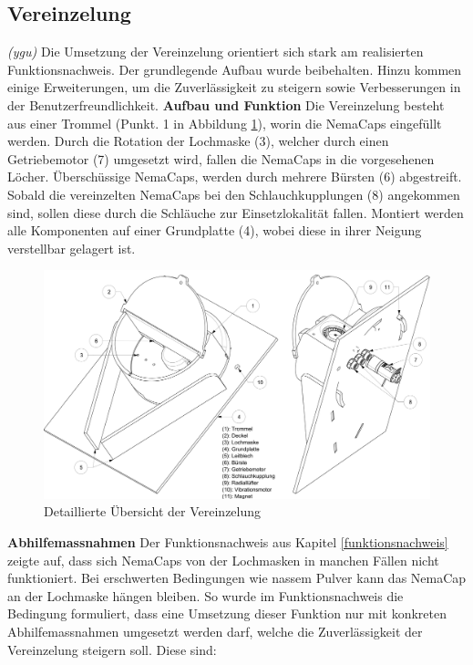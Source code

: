\subsection{Vereinzelung} \label{sec:Vereinzelung}
\textit{(ygu)} Die Umsetzung der Vereinzelung orientiert sich stark am realisierten Funktionsnachweis. Der grundlegende Aufbau wurde beibehalten. Hinzu kommen einige Erweiterungen, um die Zuverlässigkeit zu steigern sowie Verbesserungen in der Benutzerfreundlichkeit.
\newline
\newline
\textbf{Aufbau und Funktion}
\newline
Die Vereinzelung besteht aus einer Trommel (Punkt. 1 in Abbildung \ref{fig:details_vereinzelung}), worin die NemaCaps eingefüllt werden. Durch die Rotation der Lochmaske (3), welcher durch einen Getriebemotor (7) umgesetzt wird, fallen die NemaCaps in die vorgesehenen Löcher. Überschüssige NemaCaps, werden durch mehrere Bürsten (6) abgestreift. Sobald die vereinzelten NemaCaps bei den Schlauchkupplungen (8) angekommen sind, sollen diese durch die Schläuche zur Einsetzlokalität fallen. Montiert werden alle Komponenten auf einer Grundplatte (4), wobei diese in ihrer Neigung verstellbar gelagert ist.
	\begin{figure}[H]
	\includegraphics[scale=0.45]{Illustrationen/6-Umsetzung/details_vereinzelung.jpg}
	\caption{Detaillierte Übersicht der Vereinzelung}
	\label{fig:details_vereinzelung}
	\end{figure}
\textbf{Abhilfemassnahmen}
\newline
Der Funktionsnachweis aus Kapitel \ref{funktionsnachweis} zeigte auf, dass sich NemaCaps von der Lochmasken in manchen Fällen nicht funktioniert. Bei erschwerten Bedingungen wie nassem Pulver kann das NemaCap an der Lochmaske hängen bleiben. So wurde im Funktionsnachweis die Bedingung formuliert, dass eine Umsetzung dieser Funktion nur mit konkreten Abhilfemassnahmen umgesetzt werden darf, welche die Zuverlässigkeit der Vereinzelung steigern soll. Diese sind:
